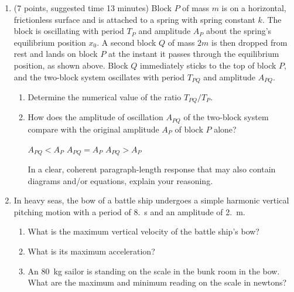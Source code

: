 \documentclass{../../../oss-apphys}
\begin{document}
\begin{center}
\end{center}
\begin{enumerate}[leftmargin=15pt]
\item (7 points, suggested time 13 minutes) Block $P$ of mass $m$ is on a
  horizontal, frictionless surface and is attached to a spring with spring
  constant $k$. The block is oscillating with period $T_P$ and amplitude $A_P$
  about the spring's equilibrium position $x_0$. A second block $Q$ of mass
  $2m$ is then dropped from rest and lands on block $P$ at the instant it
  passes through the equilibrium position, as shown above. Block $Q$
  immediately sticks to the top of block $P$, and the two-block system
  oscillates with period $T_{PQ}$ and amplitude $A_{PQ}$.
  \begin{enumerate}[leftmargin=18pt]
  \item Determine the numerical value of the ratio $T_{PQ}/T_P$.
    \vspace{1in}
  \item How does the amplitude of oscillation $A_{PQ}$ of the two-block system
    compare with the original amplitude $A_P$ of block $P$ alone?

    \vspace{.1in}
    \underline{\hspace{.3in}} $A_{PQ}<A_{P}$\hspace{.25in}
    \underline{\hspace{.3in}} $A_{PQ}=A_{P}$\hspace{.25in}
    \underline{\hspace{.3in}} $A_{PQ}>A_{P}$

    \vspace{.2in}In a clear, coherent paragraph-length response that may also
    contain diagrams and/or equations, explain your reasoning.
  \end{enumerate}
  \newpage
  
\item In heavy seas, the bow of a battle ship undergoes a simple harmonic
  vertical pitching motion with a period of \SI{8.}{\second} and an amplitude
  of \SI{2.}{\metre}.
  \begin{enumerate}[leftmargin=18pt]
  \item What is the maximum vertical velocity of the battle ship's bow?
  \item What is its maximum acceleration?
  \item An \SI{80}{\kilo\gram} sailor is standing on the scale in the bunk room
    in the bow. What are the maximum and minimum reading on the scale in
    newtons?
    \vspace{.8in}
  \end{enumerate}


\end{enumerate}
\end{document}
